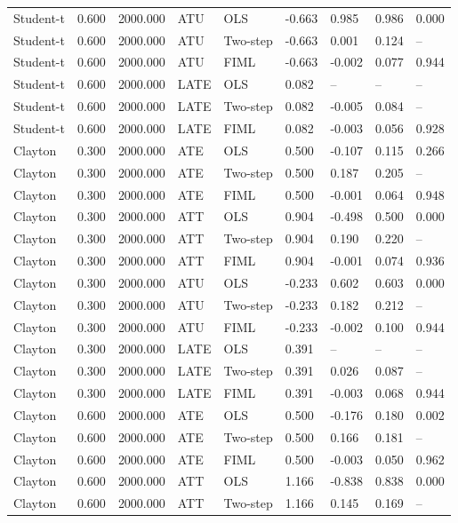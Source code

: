\begin{table}[htbp]
\begin{tabular}{lllllllll}
Student-t & 0.600 & 2000.000 & ATU & OLS & -0.663 & 0.985 & 0.986 & 0.000 \\
Student-t & 0.600 & 2000.000 & ATU & Two-step & -0.663 & 0.001 & 0.124 & -- \\
Student-t & 0.600 & 2000.000 & ATU & FIML & -0.663 & -0.002 & 0.077 & 0.944 \\
Student-t & 0.600 & 2000.000 & LATE & OLS & 0.082 & -- & -- & -- \\
Student-t & 0.600 & 2000.000 & LATE & Two-step & 0.082 & -0.005 & 0.084 & -- \\
Student-t & 0.600 & 2000.000 & LATE & FIML & 0.082 & -0.003 & 0.056 & 0.928 \\
Clayton & 0.300 & 2000.000 & ATE & OLS & 0.500 & -0.107 & 0.115 & 0.266 \\
Clayton & 0.300 & 2000.000 & ATE & Two-step & 0.500 & 0.187 & 0.205 & -- \\
Clayton & 0.300 & 2000.000 & ATE & FIML & 0.500 & -0.001 & 0.064 & 0.948 \\
Clayton & 0.300 & 2000.000 & ATT & OLS & 0.904 & -0.498 & 0.500 & 0.000 \\
Clayton & 0.300 & 2000.000 & ATT & Two-step & 0.904 & 0.190 & 0.220 & -- \\
Clayton & 0.300 & 2000.000 & ATT & FIML & 0.904 & -0.001 & 0.074 & 0.936 \\
Clayton & 0.300 & 2000.000 & ATU & OLS & -0.233 & 0.602 & 0.603 & 0.000 \\
Clayton & 0.300 & 2000.000 & ATU & Two-step & -0.233 & 0.182 & 0.212 & -- \\
Clayton & 0.300 & 2000.000 & ATU & FIML & -0.233 & -0.002 & 0.100 & 0.944 \\
Clayton & 0.300 & 2000.000 & LATE & OLS & 0.391 & -- & -- & -- \\
Clayton & 0.300 & 2000.000 & LATE & Two-step & 0.391 & 0.026 & 0.087 & -- \\
Clayton & 0.300 & 2000.000 & LATE & FIML & 0.391 & -0.003 & 0.068 & 0.944 \\
Clayton & 0.600 & 2000.000 & ATE & OLS & 0.500 & -0.176 & 0.180 & 0.002 \\
Clayton & 0.600 & 2000.000 & ATE & Two-step & 0.500 & 0.166 & 0.181 & -- \\
Clayton & 0.600 & 2000.000 & ATE & FIML & 0.500 & -0.003 & 0.050 & 0.962 \\
Clayton & 0.600 & 2000.000 & ATT & OLS & 1.166 & -0.838 & 0.838 & 0.000 \\
Clayton & 0.600 & 2000.000 & ATT & Two-step & 1.166 & 0.145 & 0.169 & -- \\

\end{tabular}
\end{table}
